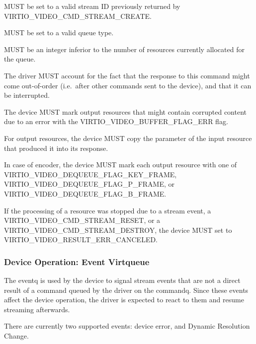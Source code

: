 
 MUST be set to a valid stream ID previously returned
by VIRTIO_VIDEO_CMD_STREAM_CREATE.

 MUST be set to a valid queue type.

 MUST be an integer inferior to the number of
resources currently allocated for the queue.

The driver MUST account for the fact that the response to this command
might come out-of-order (i.e.~after other commands sent to the device),
and that it can be interrupted.


The device MUST mark output resources that might contain corrupted
content due to an error with the VIRTIO_VIDEO_BUFFER_FLAG_ERR flag.

For output resources, the device MUST copy the 
parameter of the input resource that produced it into its response.

In case of encoder, the device MUST mark each output resource with one
of VIRTIO_VIDEO_DEQUEUE_FLAG_KEY_FRAME,
VIRTIO_VIDEO_DEQUEUE_FLAG_P_FRAME, or
VIRTIO_VIDEO_DEQUEUE_FLAG_B_FRAME.

If the processing of a resource was stopped due to a stream event, a
VIRTIO_VIDEO_CMD_STREAM_RESET, or a
VIRTIO_VIDEO_CMD_STREAM_DESTROY, the device MUST set 
to VIRTIO_VIDEO_RESULT_ERR_CANCELED.

\subsubsection{Device Operation: Event Virtqueue}\label{sec:Device Types / Video Device / Device Operation / Device Operation: Event Virtqueue}

The eventq is used by the device to signal stream events that are not a
direct result of a command queued by the driver on the commandq. Since
these events affect the device operation, the driver is expected to
react to them and resume streaming afterwards.

There are currently two supported events: device error, and Dynamic
Resolution Change.

